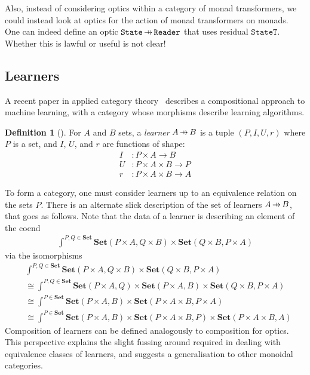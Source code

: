 \documentclass[11pt,letterpaper]{article}
\theoremstyle{plain}
\theoremstyle{definition}
\newtheorem{definition}[theorem]{Definition}
\newcommand{\Set}{\mathbf{Set}}
\newcommand{\hto}{\ensuremath{\,\mathaccent\shortmid\rightarrow\,}}
\newcommand{\todo}[1]{\textcolor{red}{\small #1}}
\begin{document}
Also, instead of considering optics within a category of monad transformers, we could instead look at optics for the action of monad transformers on monads. One can indeed define an optic $\texttt{State} \hto \texttt{Reader}$ that uses residual $\texttt{StateT}$. Whether this is lawful or useful is not clear!

\subsection{Learners}
A recent paper in applied category theory~\cite{BackpropAsFunctor} describes a compositional approach to machine learning, with a category whose morphisms describe learning algorithms.

\begin{definition}[{\cite[Definition 2.1]{BackpropAsFunctor}}]
For $A$ and $B$ sets, a \emph{learner} $A \hto B$ is a tuple $(P, I, U, r)$ where $P$ is a set, and $I$, $U$, and $r$ are functions of shape:
\begin{align*}
I &: P \times A \to B \\
U &: P \times A \times B \to P \\
r &: P \times A \times B \to A
\end{align*}
\end{definition}
To form a category, one must consider learners up to an equivalence relation on the sets $P$. There is an alternate slick description of the set of learners $A \hto B$, that goes as follows. Note that the data of a learner is describing an element of the coend
\begin{align*}
\int^{P, Q \in \Set} \Set(P \times A, Q \times B) \times \Set(Q \times B, P \times A)
\end{align*}
via the isomorphisms
\begin{align*}
&\int^{P, Q \in \Set} \Set(P \times A, Q \times B) \times \Set(Q \times B, P \times A) \\
&\cong \int^{P, Q \in \Set} \Set(P \times A, Q) \times \Set(P \times A, B) \times \Set(Q \times B, P \times A) \\
&\cong \int^{P \in \Set} \Set(P \times A, B) \times \Set(P \times A \times B, P \times A) \\
&\cong \int^{P \in \Set} \Set(P \times A, B) \times \Set(P \times A \times B, P) \times \Set(P \times A \times B, A)
\end{align*}
Composition of learners can be defined analogously to composition for optics. This perspective explains the slight fussing around required in dealing with equivalence classes of learners, and suggests a generalisation to other monoidal categories.

%
%
%



\end{document}
